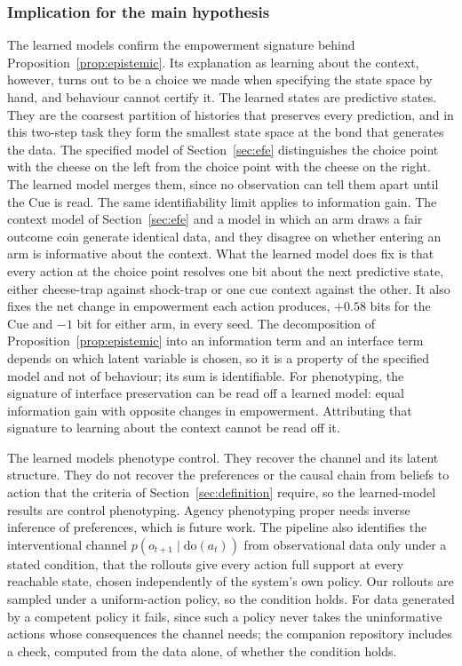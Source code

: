 \documentclass[pdflatex,sn-apa]{sn-jnl}%
\theoremstyle{definition}
\begin{document}
\subsubsection{Implication for the main hypothesis} The learned models confirm the empowerment signature behind Proposition~\ref{prop:epistemic}. Its explanation as learning about the context, however, turns out to be a choice we made when specifying the state space by hand, and behaviour cannot certify it. The learned states are predictive states. They are the coarsest partition of histories that preserves every prediction, and in this two-step task they form the smallest state space at the bond that generates the data. The specified model of Section~\ref{sec:efe} distinguishes the choice point with the cheese on the left from the choice point with the cheese on the right. The learned model merges them, since no observation can tell them apart until the Cue is read. The same identifiability limit applies to information gain. The context model of Section~\ref{sec:efe} and a model in which an arm draws a fair outcome coin generate identical data, and they disagree on whether entering an arm is informative about the context. What the learned model does fix is that every action at the choice point resolves one bit about the next predictive state, either cheese-trap against shock-trap or one cue context against the other. It also fixes the net change in empowerment each action produces, $+0.58$ bits for the Cue and $-1$ bit for either arm, in every seed. The decomposition of Proposition~\ref{prop:epistemic} into an information term and an interface term depends on which latent variable is chosen, so it is a property of the specified model and not of behaviour; its sum is identifiable. For phenotyping, the signature of interface preservation can be read off a learned model: equal information gain with opposite changes in empowerment. Attributing that signature to learning about the context cannot be read off it.

The learned models phenotype control. They recover the channel and its latent structure. They do not recover the preferences or the causal chain from beliefs to action that the criteria of Section~\ref{sec:definition} require, so the learned-model results are control phenotyping. Agency phenotyping proper needs inverse inference of preferences, which is future work. The pipeline also identifies the interventional channel $p(o_{t+1} \mid \mathrm{do}(a_t))$ from observational data only under a stated condition, that the rollouts give every action full support at every reachable state, chosen independently of the system's own policy. Our rollouts are sampled under a uniform-action policy, so the condition holds. For data generated by a competent policy it fails, since such a policy never takes the uninformative actions whose consequences the channel needs; the companion repository includes a check, computed from the data alone, of whether the condition holds.
\end{document}
